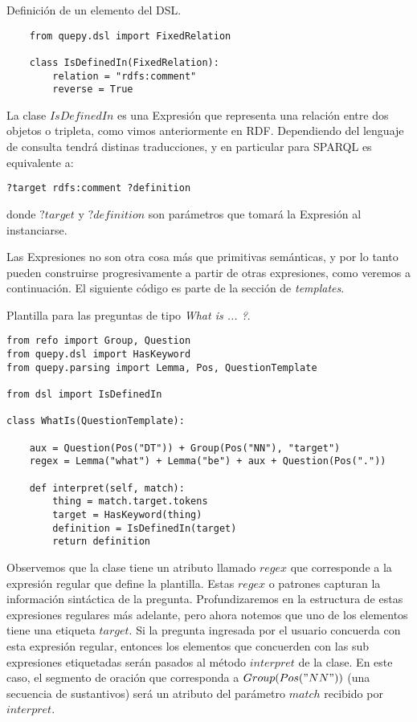 \begin{example}Definición de un elemento del DSL.
    \begin{lstlisting}
    from quepy.dsl import FixedRelation

    class IsDefinedIn(FixedRelation):
        relation = "rdfs:comment"
        reverse = True
    \end{lstlisting}
\end{example}

La clase $IsDefinedIn$ es una Expresión que representa una relación entre dos objetos o tripleta, como vimos anteriormente en RDF. Dependiendo del lenguaje de consulta tendrá distinas traducciones, y en particular para SPARQL es equivalente a:

\begin{lstlisting}
?target rdfs:comment ?definition
\end{lstlisting}

donde $?target$ y $?definition$ son parámetros que tomará la Expresión al instanciarse.

Las Expresiones no son otra cosa más que primitivas semánticas, y por lo tanto pueden construirse progresivamente a partir de otras expresiones, como veremos a continuación. El siguiente código es parte de la sección de \textit{templates}.

\begin{example}\label{plantilla-quepy} Plantilla para las preguntas de tipo \textit{What is ... ?}.
\begin{lstlisting}
from refo import Group, Question
from quepy.dsl import HasKeyword
from quepy.parsing import Lemma, Pos, QuestionTemplate

from dsl import IsDefinedIn

class WhatIs(QuestionTemplate):

    aux = Question(Pos("DT")) + Group(Pos("NN"), "target")
    regex = Lemma("what") + Lemma("be") + aux + Question(Pos("."))

    def interpret(self, match):
        thing = match.target.tokens
        target = HasKeyword(thing)
        definition = IsDefinedIn(target)
        return definition
\end{lstlisting}
\end{example}

Observemos que la clase tiene un atributo llamado $regex$ que corresponde a la expresión regular que define la plantilla. Estas $regex$ o patrones capturan la información sintáctica de la pregunta. Profundizaremos en la estructura de estas expresiones regulares más adelante, pero ahora notemos que uno de los elementos tiene una etiqueta $target$. Si la pregunta ingresada por el usuario concuerda con esta expresión regular, entonces los elementos que concuerden con las sub expresiones etiquetadas serán pasados al método $interpret$ de la clase. En este caso, el segmento de oración que corresponda a $Group(Pos("NN"))$ (una secuencia de sustantivos) será un atributo del parámetro $match$ recibido por $interpret$.

